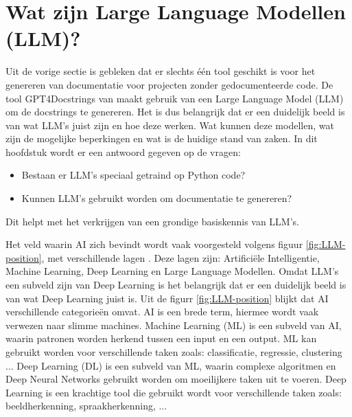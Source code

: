 \begin{table}[h!]
  \centering
  \caption{Wat kunnen de tools genereren}
  \label{table:ra-tools}
  \end{table}

\section{Wat zijn Large Language Modellen (LLM)?}
\label{sec:wat-zijn-llms}

Uit de vorige sectie is gebleken dat er slechts één tool geschikt is voor het genereren van documentatie voor projecten zonder gedocumenteerde code. 
De tool GPT4Docstrings van \textcite{Trofficus2023} maakt gebruik van een Large Language Model (LLM) om de docstrings te genereren.
Het is dus belangrijk dat er een duidelijk beeld is van wat LLM's juist zijn en hoe deze werken.
Wat kunnen deze modellen, wat zijn de mogelijke beperkingen en wat is de huidige stand van zaken. 
In dit hoofdstuk wordt er een antwoord gegeven op de vragen: 
\begin{itemize}
  \item Bestaan er LLM's speciaal getraind op Python code? 
  \item Kunnen LLM's gebruikt worden om documentatie te genereren?
\end{itemize}
Dit helpt met het verkrijgen van een grondige basiskennis van LLM's. 

Het veld waarin AI zich bevindt wordt vaak voorgesteld volgens figuur \ref{fig:LLM-position}, met verschillende lagen \autocite{Stoeffelbauer2023}.
Deze lagen zijn: Artificiële Intelligentie, Machine Learning, Deep Learning en Large Language Modellen.
Omdat LLM's een subveld zijn van Deep Learning is het belangrijk dat er een duidelijk beeld is van wat Deep Learning juist is.
Uit de figurr \ref{fig:LLM-position} blijkt dat AI verschillende categorieën omvat.
AI is een brede term, hiermee wordt vaak verwezen naar slimme machines. 
Machine Learning (ML) is een subveld van AI, waarin patronen worden herkend tussen een input en een output.
ML kan gebruikt worden voor verschillende taken zoals: classificatie, regressie, clustering ...
Deep Learning (DL) is een subveld van ML, waarin complexe algoritmen en Deep Neural Networks gebruikt worden om moeilijkere taken uit te voeren.
Deep Learning is een krachtige tool die gebruikt wordt voor verschillende taken zoals: beeldherkenning, spraakherkenning, ... \autocite{Stoeffelbauer2023}

